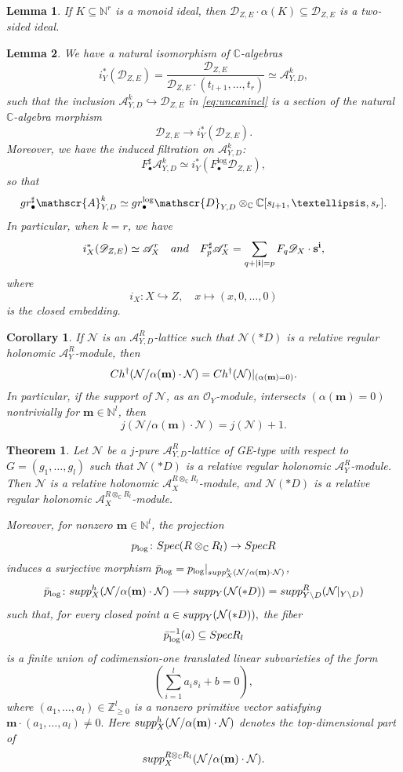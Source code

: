 \documentclass[10pt,a4paper]{amsart}
\newtheorem{lemma}{Lemma}
\newtheorem{coro}{Corollary}
\newtheorem{theorem}{Theorem}
\newcommand{\C}{\mathbb{C}} %
\newcommand{\Ch}{\textup{Ch}}
\newcommand{\N}{\mathbb{N}}
\newcommand{\Spec}{\textup{Spec }}
\newcommand{\Z}{\mathbb{Z}}
\newcommand{\bm}{\mathbf{m}}
\newcommand{\cN}{\mathcal{N}}
\newcommand{\cO}{\mathscr{O}}
\newcommand{\gr}{\textup{gr}}
\newcommand{\sA}{\mathscr{A}}
\newcommand{\shD}{\mathscr{D}}
\newcommand{\supp}{\textup{supp}}
\begin{document}
\begin{lemma}\label{lm:twosidedideal}
If $K\subseteq \N^r$ is a monoid ideal, then
$\shD_{Z,E}\cdot \alpha(K)\subseteq \shD_{Z,E}$ is a two-sided ideal.
\end{lemma}

\begin{lemma}\label{lm:logsp}
We have a natural isomorphism of $\C$-algebras
\[
i_Y^*(\shD_{Z,E})
=
\frac{\shD_{Z,E}}{\shD_{Z,E}\cdot(t_{l+1},\dots,t_r)}
\simeq
\sA^k_{Y,D},
\]
such that the inclusion $\sA^k_{Y,D}\hookrightarrow \shD_{Z,E}$ in \eqref{eq:uncanincl} is a section of the natural $\C$-algebra morphism
\[
\shD_{Z,E}\longrightarrow i_Y^*(\shD_{Z,E}).
\]
Moreover, we have the induced filtration on $\sA^k_{Y,D}$:
\[
F^\sharp_\bullet\sA^k_{Y,D}
\simeq
i_Y^*(F^{\log}_\bullet\shD_{Z,E}),
\]
so that
\[
\gr^\sharp_\bullet\sA^k_{Y,D}
\simeq
\gr^{\log}_\bullet\shD_{Y,D}\otimes_\C \C[s_{l+1},\dots,s_r].
\]
In particular, when $k=r$, we have
\[
i_X^*(\shD_{Z,E})\simeq \sA_X^r
\quad \textup{and} \quad
F^\sharp_p\sA_X^r
=
\sum_{q+|\mathbf{i}|=p}F_q\shD_X\cdot \mathbf{s}^{\mathbf{i}},
\]
where
\[
i_X\colon X\hookrightarrow Z,\quad x\mapsto (x,0,\dots,0)
\]
is the closed embedding.
\end{lemma}

\begin{coro}\label{cor:puregradequot}
If $\cN$ is an $\sA_{Y,D}^R$-lattice such that $\cN(*D)$ is a relative regular holonomic $\sA_Y^R$-module, then
\[
\Ch^\dagger(\cN/\alpha(\bm)\cdot\cN)
=
\Ch^\dagger(\cN)|_{(\alpha(\bm)=0)}.
\]
In particular, if the support of $\cN$, as an $\cO_Y$-module, intersects $(\alpha(\bm)=0)$ nontrivially for $\bm\in \N^l$, then
\[
j(\cN/\alpha(\bm)\cdot\cN)=j(\cN)+1.
\]
\end{coro}

\begin{theorem}\label{thm:mainsuppfiberation}
Let $\cN$ be a $j$-pure $\sA^R_{Y,D}$-lattice of GE-type with respect to
$G=(g_1,\dots,g_l)$
such that $\cN(*D)$ is a relative regular holonomic $\sA^R_Y$-module. Then $\cN$ is a relative holonomic $\sA_X^{R\otimes_\C R_l}$-module, and $\cN(*D)$ is a relative regular holonomic $\sA_X^{R\otimes_\C R_l}$-module.

Moreover, for nonzero $\bm\in\N^l$, the projection
\[
p_{\log}\colon \Spec(R\otimes_\C R_l)\to \Spec R
\]
induces a surjective morphism $\bar p_{\log}
=
p_{\log}|_{\supp^h_X(\cN/\alpha(\bm)\cdot\cN)}$,
\[
\bar p_{\log}
\colon
\supp^h_X(\cN/\alpha(\bm)\cdot\cN)
\longrightarrow
\supp_Y(\cN(*D))
=
\supp^R_{Y\setminus D}(\cN|_{Y\setminus D})
\]
such that, for every closed point
$a\in \supp_Y(\cN(*D)),$
the fiber
\[
\bar p_{\log}^{-1}(a)\subseteq \Spec R_l
\]
is a finite union of codimension-one translated linear subvarieties of the form
\[
\left(\sum_{i=1}^l a_i s_i+b=0\right),
\]
where $(a_1,\dots,a_l)\in \Z_{\ge 0}^l$ is a nonzero primitive vector satisfying
$\bm\cdot(a_1,\dots,a_l)\neq 0.$
Here
$\supp^h_X(\cN/\alpha(\bm)\cdot\cN)$
denotes the top-dimensional part of
\[
\supp_X^{R\otimes_\C R_l}(\cN/\alpha(\bm)\cdot\cN).
\]
\end{theorem}
\end{document}

